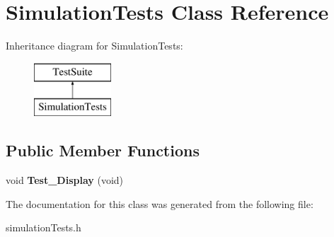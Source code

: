 \hypertarget{classSimulationTests}{\section{Simulation\-Tests Class Reference}
\label{classSimulationTests}
}
Inheritance diagram for Simulation\-Tests\-:\begin{figure}[H]
\begin{center}
\leavevmode
\includegraphics[height=2.000000cm]{classSimulationTests}
\end{center}
\end{figure}
\subsection*{Public Member Functions}
\begin{DoxyCompactItemize}
\item 
\hypertarget{classSimulationTests_a439d90ebe8b4b230f39b5f063f1a7967}{void {\bfseries Test\-\_\-\-Display} (void)}\label{classSimulationTests_a439d90ebe8b4b230f39b5f063f1a7967}

\end{DoxyCompactItemize}


The documentation for this class was generated from the following file\-:\begin{DoxyCompactItemize}
\item 
simulation\-Tests.\-h\end{DoxyCompactItemize}
